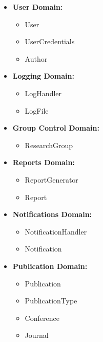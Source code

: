 \documentclass{article}
\begin{document}
		\begin{multicols}{2}
		
			\begin{itemize} 
				\item \textbf{User Domain:}
						\begin{itemize}
						\item User
						\item UserCredentials
						\item Author
						\end{itemize}
					
				\item \textbf{Logging Domain:}
						\begin{itemize}
						\item LogHandler
						\item LogFile
						\end{itemize}				
					
					
				\item \textbf{Group Control Domain:}
						\begin{itemize}
						\item ResearchGroup
						\end{itemize}
						
					\columnbreak

					
				\item \textbf{Reports Domain:}

						\begin{itemize}
						\item ReportGenerator
						\item Report
						\end{itemize}
					
				\item \textbf{Notifications Domain:}
						\begin{itemize}
						\item NotificationHandler
						\item Notification
						\end{itemize}

					
				\item \textbf{Publication Domain:}
						\begin{itemize}
						\item Publication
						\item PublicationType
						\item Conference
						\item Journal
						\end{itemize}		
				
			\end{itemize}
		\end{multicols}
	\cleardoublepage
\end{document}
